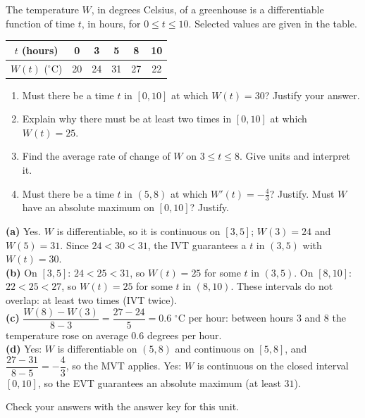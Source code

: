 \documentclass[11pt]{article}
\begin{document}
\begin{exo}{}
The temperature $W$, in degrees Celsius, of a greenhouse is a differentiable function of time $t$, in hours, for $0\le t\le10$. Selected values are given in the table.
\begin{center}\begin{tabular}{|c|c|c|c|c|c|}\hline
$t$ (hours) & 0 & 3 & 5 & 8 & 10\\\hline $W(t)$ ($^\circ$C) & 20 & 24 & 31 & 27 & 22\\\hline\end{tabular}\end{center}
\begin{enumerate}[label=(\alph*)]
\item Must there be a time $t$ in $[0,10]$ at which $W(t)=30$? Justify your answer.
\item Explain why there must be at least two times in $[0,10]$ at which $W(t)=25$.
\item Find the average rate of change of $W$ on $3\le t\le8$. Give units and interpret it.
\item Must there be a time $t$ in $(5,8)$ at which $W'(t)=-\frac43$? Justify. Must $W$ have an absolute maximum on $[0,10]$? Justify.
\end{enumerate}
\begin{solution}
\textbf{(a)} Yes. $W$ is differentiable, so it is continuous on $[3,5]$; $W(3)=24$ and $W(5)=31$. Since $24<30<31$, the IVT guarantees a $t$ in $(3,5)$ with $W(t)=30$.\\
\textbf{(b)} On $[3,5]$: $24<25<31$, so $W(t)=25$ for some $t$ in $(3,5)$. On $[8,10]$: $22<25<27$, so $W(t)=25$ for some $t$ in $(8,10)$. These intervals do not overlap: at least two times (IVT twice).\\
\textbf{(c)} $\dfrac{W(8)-W(3)}{8-3}=\dfrac{27-24}{5}=0.6$ $^\circ$C per hour: between hours $3$ and $8$ the temperature rose on average $0.6$ degrees per hour.\\
\textbf{(d)} Yes: $W$ is differentiable on $(5,8)$ and continuous on $[5,8]$, and $\dfrac{27-31}{8-5}=-\dfrac43$, so the MVT applies. Yes: $W$ is continuous on the closed interval $[0,10]$, so the EVT guarantees an absolute maximum (at least $31$).
\end{solution}
\end{exo}

\ifkey\else
\vfill
\begin{center}\small\color{apgrey}Check your answers with the answer key for this unit.\end{center}
\fi
\end{document}
